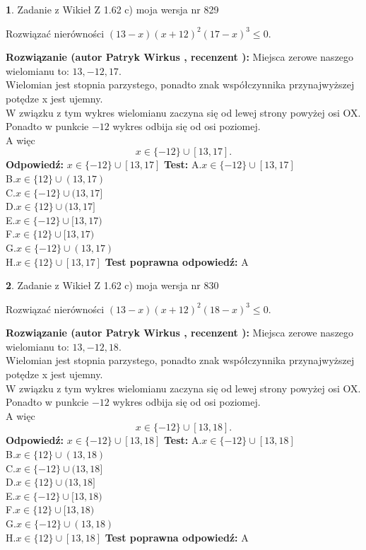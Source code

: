 \documentclass[12pt, a4paper]{article}
\theoremstyle{definition} %
\newtheorem{zad}{}
\newcommand{\zadStart}[1]{\begin{zad}#1\newline}
\newcommand{\zadStop}{\end{zad}}
\newcommand{\rozwStart}[2]{\noindent \textbf{Rozwiązanie (autor #1 , recenzent #2): }\newline}
\newcommand{\rozwStop}{\newline}
\newcommand{\odpStart}{\noindent \textbf{Odpowiedź:}\newline}
\newcommand{\odpStop}{\newline}
\newcommand{\testStart}{\noindent \textbf{Test:}\newline}
\newcommand{\testStop}{\newline}
\newcommand{\kluczStart}{\noindent \textbf{Test poprawna odpowiedź:}\newline}
\newcommand{\kluczStop}{\newline}
\begin{document}
\zadStart{Zadanie z Wikieł Z 1.62 c) moja wersja nr 829}

Rozwiązać nierówności $(13-x)(x+12)^{2}(17-x)^{3}\le0$.
\zadStop
\rozwStart{Patryk Wirkus}{}
Miejsca zerowe naszego wielomianu to: $13, -12, 17$.\\
Wielomian jest stopnia parzystego, ponadto znak współczynnika przy\linebreak najwyższej potędze x jest ujemny.\\ W związku z tym wykres wielomianu zaczyna się od lewej strony powyżej osi OX.\\
Ponadto w punkcie $-12$ wykres odbija się od osi poziomej.\\
A więc $$x \in \{-12\} \cup [13,17].$$
\rozwStop
\odpStart
$x \in \{-12\} \cup [13,17]$
\odpStop
\testStart
A.$x \in \{-12\} \cup [13,17]$\\
B.$x \in \{12\} \cup (13,17)$\\
C.$x \in \{-12\} \cup (13,17]$\\
D.$x \in \{12\} \cup (13,17]$\\
E.$x \in \{-12\} \cup [13,17)$\\
F.$x \in \{12\} \cup [13,17)$\\
G.$x \in \{-12\} \cup (13,17)$\\
H.$x \in \{12\} \cup [13,17]$
\testStop
\kluczStart
A
\kluczStop



\zadStart{Zadanie z Wikieł Z 1.62 c) moja wersja nr 830}

Rozwiązać nierówności $(13-x)(x+12)^{2}(18-x)^{3}\le0$.
\zadStop
\rozwStart{Patryk Wirkus}{}
Miejsca zerowe naszego wielomianu to: $13, -12, 18$.\\
Wielomian jest stopnia parzystego, ponadto znak współczynnika przy\linebreak najwyższej potędze x jest ujemny.\\ W związku z tym wykres wielomianu zaczyna się od lewej strony powyżej osi OX.\\
Ponadto w punkcie $-12$ wykres odbija się od osi poziomej.\\
A więc $$x \in \{-12\} \cup [13,18].$$
\rozwStop
\odpStart
$x \in \{-12\} \cup [13,18]$
\odpStop
\testStart
A.$x \in \{-12\} \cup [13,18]$\\
B.$x \in \{12\} \cup (13,18)$\\
C.$x \in \{-12\} \cup (13,18]$\\
D.$x \in \{12\} \cup (13,18]$\\
E.$x \in \{-12\} \cup [13,18)$\\
F.$x \in \{12\} \cup [13,18)$\\
G.$x \in \{-12\} \cup (13,18)$\\
H.$x \in \{12\} \cup [13,18]$
\testStop
\kluczStart
A
\kluczStop
\end{document}

